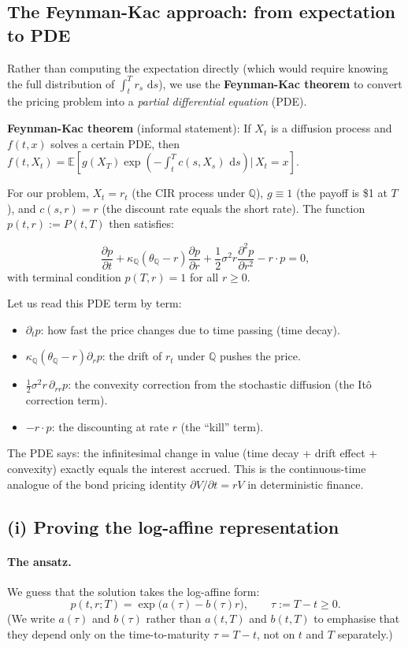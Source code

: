 \documentclass[11pt]{article}
\newcommand{\QQ}{\mathbb{Q}}
\newcommand{\EE}{\mathbb{E}}
\newcommand{\dd}{\,\mathrm{d}}
\begin{document}
\subsection{The Feynman-Kac approach: from expectation to PDE}

Rather than computing the expectation directly (which would require knowing
the full distribution of $\int_t^T r_s\,\dd s$), we use the
\textbf{Feynman-Kac theorem} to convert the pricing problem into a
\emph{partial differential equation} (PDE).

\textbf{Feynman-Kac theorem} (informal statement): If $X_t$ is a diffusion
process and $f(t,x)$ solves a certain PDE, then
$f(t,X_t) = \EE\!\left[g(X_T)\exp\!\left(-\int_t^T c(s,X_s)\,\dd s\right)\bigg|\,X_t=x\right]$.

For our problem, $X_t = r_t$ (the CIR process under $\QQ$), $g\equiv 1$
(the payoff is \$1 at $T$), and $c(s,r) = r$ (the discount rate equals the
short rate).  The function $p(t,r) := P(t,T)$ then satisfies:

\[
\frac{\partial p}{\partial t}
+ \kappa_\QQ(\theta_\QQ - r)\frac{\partial p}{\partial r}
+ \frac{1}{2}\sigma^2 r\frac{\partial^2 p}{\partial r^2}
- r\cdot p = 0,
\]
with terminal condition $p(T,r) = 1$ for all $r \ge 0$.

Let us read this PDE term by term:
\begin{itemize}
  \item $\partial_t p$: how fast the price changes due to time passing
  (time decay).
  \item $\kappa_\QQ(\theta_\QQ-r)\partial_r p$: the drift of $r_t$ under
  $\QQ$ pushes the price.
  \item $\frac{1}{2}\sigma^2 r\,\partial_{rr} p$: the convexity correction
  from the stochastic diffusion (the It\^o correction term).
  \item $-r\cdot p$: the discounting at rate $r$ (the ``kill'' term).
\end{itemize}
The PDE says: the infinitesimal change in value (time decay + drift effect
+ convexity) exactly equals the interest accrued.  This is the continuous-time
analogue of the bond pricing identity $\partial V/\partial t = rV$ in
deterministic finance.

\subsection{(i) Proving the log-affine representation}

\paragraph{The ansatz.}  We guess that the solution takes the log-affine form:
\[
p(t,r;T) = \exp\!\big(a(\tau) - b(\tau)r\big),
\qquad \tau := T - t \ge 0.
\]
(We write $a(\tau)$ and $b(\tau)$ rather than $a(t,T)$ and $b(t,T)$ to
emphasise that they depend only on the time-to-maturity $\tau = T-t$, not
on $t$ and $T$ separately.)
\end{document}
